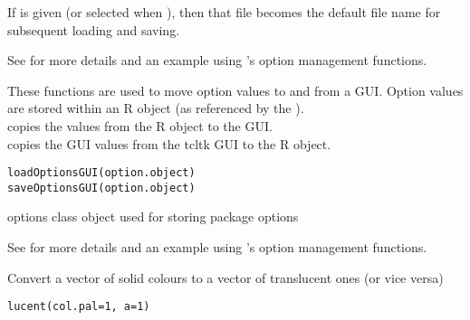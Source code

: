 \documentclass[letterpaper]{book}
\begin{document}
%
\begin{Details}\relax
If  is given (or selected when ), 
then that file becomes the default file name for subsequent loading and saving.
\end{Details}
%
\begin{SeeAlso}\relax
See  for more details and 
an example using 's option management functions.
\end{SeeAlso}
%
\begin{Description}\relax
These functions are used to move option values to and from a GUI. 
Option values are stored within an R object (as referenced by the ). \\{}
 copies the values from the R object to the GUI. \\{}
 copies the GUI values from the tcltk GUI to the R object.
\end{Description}
%
\begin{Usage}
\begin{verbatim}
loadOptionsGUI(option.object)
saveOptionsGUI(option.object)
\end{verbatim}
\end{Usage}
%
\begin{Arguments}
\begin{ldescription}
\item[\code{option.object}] options class object used for storing package options
\end{ldescription}
\end{Arguments}
%
\begin{SeeAlso}\relax
See  for more details and 
an example using 's option management functions.
\end{SeeAlso}
%
\begin{Description}\relax
Convert a vector of solid colours to a vector of translucent ones (or vice versa)
\end{Description}
%
\begin{Usage}
\begin{verbatim}
lucent(col.pal=1, a=1)
\end{verbatim}
\end{Usage}
\end{document}
